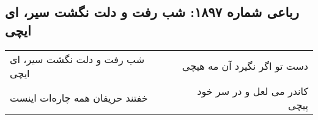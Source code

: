 \begin{center}
\section*{رباعی شماره ۱۸۹۷: شب رفت و دلت نگشت سیر، ای ایچی}
\label{sec:1897}
\begin{longtable}{l p{0.5cm} r}
شب رفت و دلت نگشت سیر، ای ایچی
&&
دست تو اگر نگیرد آن مه هیچی
\\
خفتند حریفان همه چاره‌ات اینست
&&
کاندر می لعل و در سر خود پیچی
\\
\end{longtable}
\end{center}
